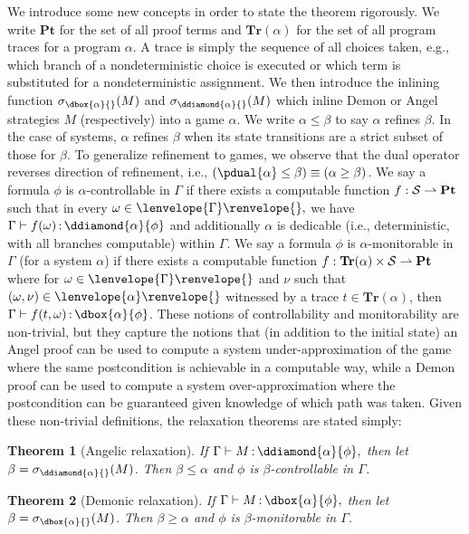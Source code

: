 \documentclass[12pt]{cmuthesis}
\newtheorem{theorem}{Theorem}
\theoremstyle{definition}
\theoremstyle{remark}
\newcommand{\allstate}{\mathcal{S}}
\newcommand{\fint}[1]{\lenvelope{#1}\renvelope}
\newcommand{\pint}[1]{\lenvelope{#1}\renvelope} %
\begin{document}
\newcommand{\allpt}{\mathbf{Pt}}
\newcommand{\alltrace}[1]{\mathbf{Tr}(#1)}
\newcommand{\dinline}[2]{\sigma_{\dbox{#1}{}}{(#2)}}
\newcommand{\ainline}[2]{\sigma_{\ddiamond{#1}{}}{(#2)}}
We introduce some new concepts in order to state the theorem rigorously.
We write $\allpt$ for the set of all proof terms and $\alltrace{\alpha}$ for the set of all program traces for a program $\alpha$.
A trace is simply the sequence of all choices taken, e.g., which branch of a nondeterministic choice is executed or which term is substituted for a nondeterministic assignment.
We then introduce the inlining function $\dinline{\alpha}{M}$ and $\ainline{\alpha}{M}$ which inline Demon or Angel strategies $M$ (respectively) into a game $\alpha$.
We write $\alpha \leq \beta$ to say $\alpha$ refines $\beta$.
In the case of systems, $\alpha$ refines $\beta$ when its state transitions are a strict subset of those for $\beta$.
To generalize refinement to games, we observe that the dual operator reverses direction of refinement, i.e., $(\pdual{\alpha} \leq \beta) \equiv (\alpha \geq \beta)$.
We say a formula $\phi$ is $\alpha$-controllable in $\Gamma$ if there exists a computable function $f:\allstate\mto\allpt$ such that in every $\omega \in \fint{\Gamma}{},$ we have $\proves{\Gamma}{f(\omega)}{\ddiamond{\alpha}{\phi}}$ and additionally $\alpha$ is dedicable (i.e., deterministic, with all branches computable) within $\Gamma$.
We say a formula $\phi$ is $\alpha$-monitorable in $\Gamma$ (for a system $\alpha$) if there exists a computable function $f:\alltrace{\alpha} \times \allstate \mto \allpt$ where for $\omega \in \fint{\Gamma}{}$ and $\nu$ such that $(\omega,\nu)\in\pint{\alpha}{}$ witnessed by a trace $t \in \alltrace{\alpha}$, then $\proves{\Gamma}{f(t,\omega)}{\dbox{\alpha}{\phi}}$.
These notions of controllability and monitorability are non-trivial, but they capture the notions that (in addition to the initial state) an Angel proof can be used to compute a system under-approximation of the game where the same postcondition is achievable in a computable way, while a Demon proof can be used to compute a system over-approximation where the postcondition can be guaranteed given knowledge of which path was taken.
Given these non-trivial definitions, the relaxation theorems are stated simply:
\begin{theorem}[Angelic relaxation]
  If $\proves{\Gamma}{M}{\ddiamond{\alpha}{\phi}},$ then let $\beta = \ainline{\alpha}{M}$.
  Then $\beta \leq \alpha$ and $\phi$ is $\beta$-controllable in $\Gamma$.
\end{theorem}
\begin{theorem}[Demonic relaxation]
  If $\proves{\Gamma}{M}{\dbox{\alpha}{\phi}},$ then let $\beta = \dinline{\alpha}{M}$.
  Then $\beta \geq \alpha$ and $\phi$ is $\beta$-monitorable in $\Gamma$.
\end{theorem}
\end{document}
